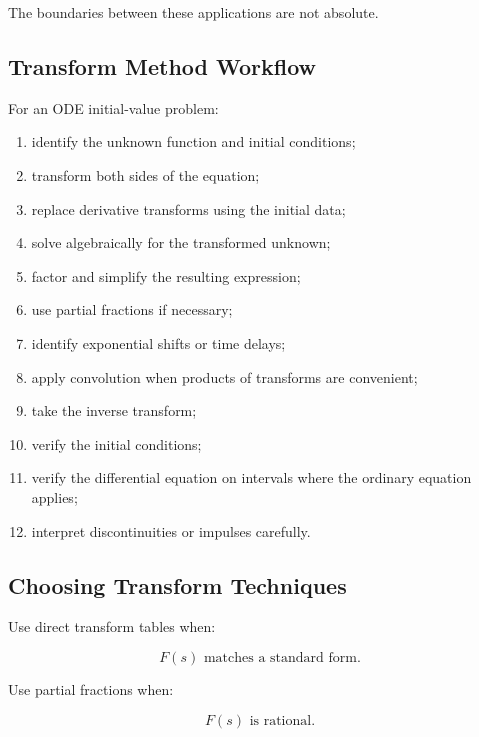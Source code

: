 The boundaries between these applications are not absolute.

\subsection{Transform Method Workflow}
\label{subsec:transform-method-workflow}

For an ODE initial-value problem:

\begin{enumerate}
    \item identify the unknown function and initial conditions;
    \item transform both sides of the equation;
    \item replace derivative transforms using the initial data;
    \item solve algebraically for the transformed unknown;
    \item factor and simplify the resulting expression;
    \item use partial fractions if necessary;
    \item identify exponential shifts or time delays;
    \item apply convolution when products of transforms are convenient;
    \item take the inverse transform;
    \item verify the initial conditions;
    \item verify the differential equation on intervals where the
          ordinary equation applies;
    \item interpret discontinuities or impulses carefully.
\end{enumerate}

\subsection{Choosing Transform Techniques}
\label{subsec:choosing-transform-technique}

Use direct transform tables when:

\[
\boxed{
F(s)
\text{ matches a standard form}.
}
\]

Use partial fractions when:

\[
\boxed{
F(s)
\text{ is rational}.
}
\]

